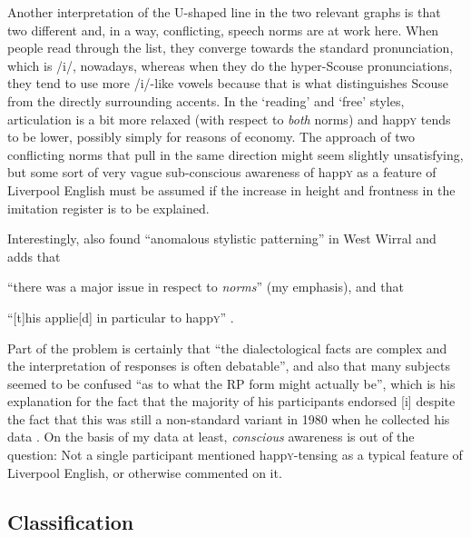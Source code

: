 Another interpretation of the U-shaped line in the two relevant graphs is that two different and, in a way, conflicting, speech norms are at work here.
When people read through the list, they converge towards the standard pronunciation, which is /i/, nowadays, whereas when they do the hyper-Scouse pronunciations, they tend to use more /i/-like vowels because that is what distinguishes Scouse from the directly surrounding accents.
In the `reading' and `free' styles, articulation is a bit more relaxed (with respect to \emph{both} norms) and happ\textsc{y} tends to be lower, possibly simply for reasons of economy.
The approach of two conflicting norms that pull in the same direction might seem slightly unsatisfying, but some sort of very vague sub-conscious awareness of happ\textsc{y} as a feature of Liverpool English must be assumed if the increase in height and frontness in the imitation register is to be explained.

Interestingly, \textcite[102]{newbrook1999} also found ``anomalous stylistic patterning'' in West Wirral and adds that 
\begin{inparaenum}[(a)]
	\item ``there was a major issue in respect to \emph{norms}'' (my emphasis), and that
	\item ``[t]his applie[d] in particular to happ\textsc{y}'' \parencite[102]{newbrook1999}.
\end{inparaenum}
Part of the problem is certainly that ``the dialectological facts are complex and the interpretation of responses is often debatable'', and also that many subjects seemed to be confused ``as to what the RP form might actually be'', which is his explanation for the fact that the majority of his participants endorsed [i] despite the fact that this was still a non-standard variant in 1980 when he collected his data \parencite[101]{newbrook1999}.
On the basis of my data at least, \emph{conscious} awareness is out of the question: Not a single participant mentioned happ\textsc{y}-tensing as a typical feature of Liverpool English, or otherwise commented on it.

\subsection{Classification}
\label{prod.disc.happy.classification}

